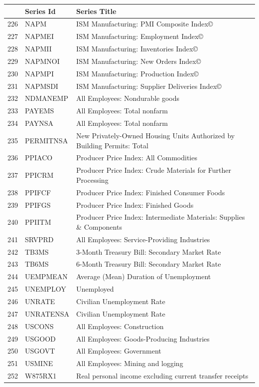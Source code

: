 \documentclass[12pt]{article}
\begin{document}
\begin{table}
\centering
\begin{tabular}{rp{5cm}p{11cm}}
	& \textbf{Series Id} & \textbf{Series Title} \\
  \hline
  \hline
	226 & NAPM & ISM Manufacturing: PMI Composite Index© \\
  \hline
	227 & NAPMEI & ISM Manufacturing: Employment Index© \\
  \hline
	228 & NAPMII & ISM Manufacturing: Inventories Index© \\
  \hline
	229 & NAPMNOI & ISM Manufacturing: New Orders Index© \\
  \hline
	230 & NAPMPI & ISM Manufacturing: Production Index© \\
  \hline
	231 & NAPMSDI & ISM Manufacturing: Supplier Deliveries Index© \\
  \hline
	232 & NDMANEMP & All Employees: Nondurable goods \\
  \hline
	233 & PAYEMS & All Employees: Total nonfarm \\
  \hline
	234 & PAYNSA & All Employees: Total nonfarm \\
  \hline
	235 & PERMITNSA & New Privately-Owned Housing Units Authorized by Building Permits: Total \\
  \hline
	236 & PPIACO & Producer Price Index: All Commodities \\
  \hline
	237 & PPICRM & Producer Price Index: Crude Materials for Further Processing \\
  \hline
	238 & PPIFCF & Producer Price Index: Finished Consumer Foods \\
  \hline
	239 & PPIFGS & Producer Price Index: Finished Goods \\
  \hline
	240 & PPIITM & Producer Price Index: Intermediate Materials: Supplies \& Components \\
  \hline
	241 & SRVPRD & All Employees: Service-Providing Industries \\
  \hline
	242 & TB3MS & 3-Month Treasury Bill: Secondary Market Rate \\
  \hline
	243 & TB6MS & 6-Month Treasury Bill: Secondary Market Rate \\
  \hline
	244 & UEMPMEAN & Average (Mean) Duration of Unemployment \\
  \hline
	245 & UNEMPLOY & Unemployed \\
  \hline
	246 & UNRATE & Civilian Unemployment Rate \\
  \hline
	247 & UNRATENSA & Civilian Unemployment Rate \\
  \hline
	248 & USCONS & All Employees: Construction \\
  \hline
	249 & USGOOD & All Employees: Goods-Producing Industries \\
  \hline
	250 & USGOVT & All Employees: Government \\
  \hline
	251 & USMINE & All Employees: Mining and logging \\
  \hline
	252 & W875RX1 & Real personal income excluding current transfer receipts \\
\end{tabular}
\end{table}




\clearpage
\newpage


\end{document}
